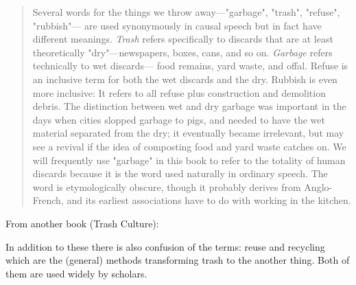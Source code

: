 \begin{quote}
Several words for the things we throw away---"garbage", "trash", "refuse", "rubbish"--- are used synonymously in causal speech but in fact have different meanings. \textit{Trash} refers specifically to discards that are at least theoretically "dry"---newspapers, boxes, cans, and so on. \textit{Garbage} refers technically to wet discards--- food remains, yard waste, and offal. Refuse is an inclusive term for both the wet discards and the dry. Rubbish is even more inclusive: It refers to all refuse plus construction and demolition debris. The distinction between wet and dry garbage was important in the days when cities slopped garbage to pigs, and needed to have the wet material separated from the dry; it eventually became irrelevant, but may see a revival if the idea of composting food and yard waste catches on. We will frequently use "garbage" in this book to refer to the totality of human discards because it is the word used naturally in ordinary speech. The word is etymologically obscure, though it probably derives from Anglo-French, and its earliest associations have to do with working in the kitchen.
\end{quote}

From another book (Trash Culture):

In addition to these there is also confusion of the terms: reuse and recycling which are the (general) methods transforming trash to the another thing. Both of them are used widely by scholars. 

